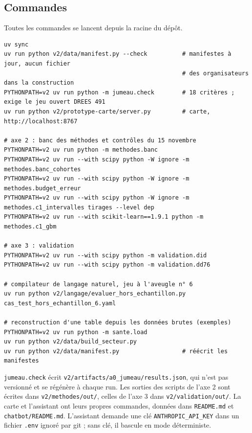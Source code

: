 \subsection{Commandes}
Toutes les commandes se lancent depuis la racine du dépôt.
\begin{small}
\begin{verbatim}
uv sync
uv run python v2/data/manifest.py --check          # manifestes à jour, aucun fichier
                                                   # des organisateurs dans la construction
PYTHONPATH=v2 uv run python -m jumeau.check        # 18 critères ; exige le jeu ouvert DREES 491
uv run python v2/prototype-carte/server.py         # carte, http://localhost:8767

# axe 2 : banc des méthodes et contrôles du 15 novembre
PYTHONPATH=v2 uv run python -m methodes.banc
PYTHONPATH=v2 uv run --with scipy python -W ignore -m methodes.banc_cohortes
PYTHONPATH=v2 uv run --with scipy python -W ignore -m methodes.budget_erreur
PYTHONPATH=v2 uv run --with scipy python -W ignore -m methodes.c1_intervalles tirages --level dep
PYTHONPATH=v2 uv run --with scikit-learn==1.9.1 python -m methodes.c1_gbm

# axe 3 : validation
PYTHONPATH=v2 uv run --with scipy python -m validation.did
PYTHONPATH=v2 uv run --with scipy python -m validation.dd76

# compilateur de langage naturel, jeu à l'aveugle n° 6
uv run python v2/langage/evaluer_hors_echantillon.py cas_test_hors_echantillon_6.yaml

# reconstruction d'une table depuis les données brutes (exemples)
PYTHONPATH=v2 uv run python -m sante.load
uv run python v2/data/build_secteur.py
uv run python v2/data/manifest.py                  # réécrit les manifestes
\end{verbatim}
\end{small}
\texttt{jumeau.check} écrit \texttt{v2/artifacts/a0\_jumeau/results.json}, qui n'est pas versionné et se
régénère à chaque run. Les sorties des scripts de l'axe 2 sont écrites dans \texttt{v2/methodes/out/}, celles de l'axe 3 dans
\texttt{v2/validation/out/}. La carte et l'assistant ont leurs propres commandes, données dans
\texttt{README.md} et \texttt{chatbot/README.md}. L'assistant demande une clé \texttt{ANTHROPIC\_API\_KEY} dans un
fichier \texttt{.env} ignoré par git ; sans clé, il bascule en mode déterministe.


